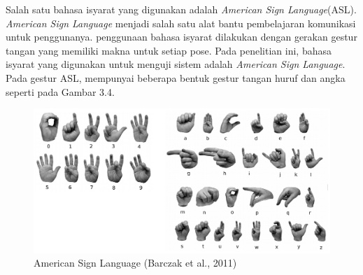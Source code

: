 Salah satu bahasa isyarat yang digunakan adalah \emph{American Sign Language}(ASL). \emph{American Sign Language} menjadi salah satu alat bantu pembelajaran komunikasi untuk penggunanya. penggunaan bahasa isyarat dilakukan dengan gerakan gestur tangan yang memiliki makna untuk setiap pose. Pada penelitian ini, bahasa isyarat yang digunakan untuk menguji sistem adalah \emph{American Sign Language}. Pada gestur ASL, mempunyai beberapa bentuk gestur tangan huruf dan angka seperti pada Gambar 3.4.
\begin{figure}[H]
	\centering
	\includegraphics[width=0.7\linewidth]{"asl"}
	\caption{American Sign Language (Barczak et al., 2011)}
	\label{fig:asl}
\end{figure}
